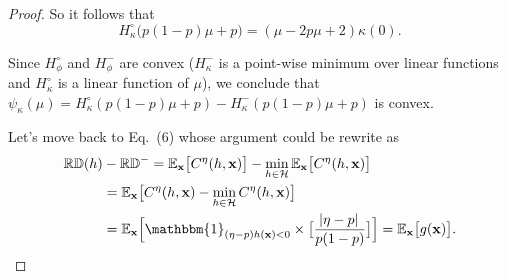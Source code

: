 \documentclass[letterpaper]{article} %
\newcommand{\x}{\mathbf{x}}
\newcommand{\E}{\mathbb{E}}
\newcommand{\I}{\mathbbm{1}}
\newcommand{\RD}{\mathbb{RD}}
\newcommand{\crd}{C^{\eta}}
\begin{document}
\begin{proof}
	So it follows that
	\[ H^{\circ}_{\kappa} \big( p ( 1- p) \mu + p \big) = ( \mu - 2p\mu + 2) \kappa (0). \]

	Since $H^{\circ}_{\phi}$ and $H^{-}_{\phi}$ are convex ($H^{-}_{\kappa}$ is a point-wise minimum over linear functions and $H^{\circ}_{\kappa}$ is a linear function of $\mu$), we conclude that $ \psi_{\kappa} ( \mu ) = H^{\circ}_{\kappa} ( p ( 1- p) \mu + p ) -  H^{-}_{\kappa} ( p ( 1- p) \mu + p )  $ 	is convex.

	Let's move back to Eq.~(6) whose argument could be rewrite as
	\begin{align*}
		\RD (h) & - \RD^{-}  = \E_\x \big[ \crd (h, \x) \big] - \min_{h \in \mathcal{H}} \E_\x \big[ \crd (h, \x) \big]                            \\
		        & = \E_\x \big[ \crd (h, \x) - \min_{h \in \mathcal{H}} \crd (h, \x) \big]                                                         \\
		        & = \E_\x \Big[ \I_{( \eta - p )  h(\x) < 0} \times \big[ \frac{ \abs{ \eta - p } }{p(1-p)} \big] \Big] = \E_\x \big[ g(\x) \big].
	\end{align*}



\end{proof}
\end{document}
